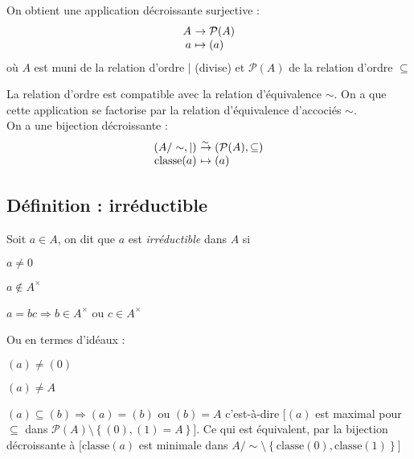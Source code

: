 \documentclass[reqno,a4paper,10pt]{report}
\makeatletter
\newcommand{\set}[1]{\left\lbrace #1 \right\rbrace} %
\newcommand{\so}{\Rightarrow}
\newcommand{\bij}{\overset{\!\sim}{\to}} %
\let\olditemize=\itemize%
\renewenvironment{itemize}{%
    \olditemize%
  }{%
    \@noparlisttrue%
    \endlist%
  }%
\makeatother
\begin{document}
On obtient une application décroissante surjective :
\[\begin{array}[t]{r@{\ }l}
  A &\to \mathcal P(A)\\
  a &\mapsto (a)
\end{array}\]
où $A$ est muni de la relation d'ordre $\mid$ (divise) et $\mathcal P(A)$ de la
relation d'ordre $\subseteq$

La relation d'ordre est compatible avec la relation d'équivalence
$\sim$. On a que cette application se factorise par la relation d'équivalence
d'accociés $\sim$.\\
On a une bijection décroissante :
\[
\begin{array}[t]{r@{\ }l}
  (A/ \sim, \mid) &\bij (\mathcal P(A), \subseteq)\\
  \mathrm{classe}(a) &\mapsto (a)
\end{array}
  \]

\subsection{Définition : irréductible}
Soit $a\in A$, on dit que $a$ est \emph{irréductible} dans $A$ si
\begin{itemize}
  \item $a\neq 0$
  \item $a \not \in A^\times$
  \item $a=bc \so b \in A^\times$ ou $c \in A^\times$
\end{itemize}

Ou en termes d'idéaux :
\begin{itemize}
  \item $(a)\neq (0)$
  \item $(a) \neq A$
  \item $(a) \subseteq (b) \so (a)=(b)$ ou $(b)=A$
\end{itemize}
c'est-à-dire $[(a)$ est maximal pour $\subseteq$ dans $\mathcal
P(A)\setminus\set{(0),(1)=A}]$. Ce qui est équivalent, par la bijection
décroissante à $[\mathrm{classe}(a)$ est minimale dans
$A/\sim\setminus\set{\mathrm{classe}(0), \mathrm{classe}(1)}]$
\end{document}
